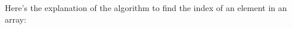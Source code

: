 \documentclass[preview]{standalone}
\begin{document}
Here's the explanation of the algorithm to find the index of an element in an array:\\
\end{document}

